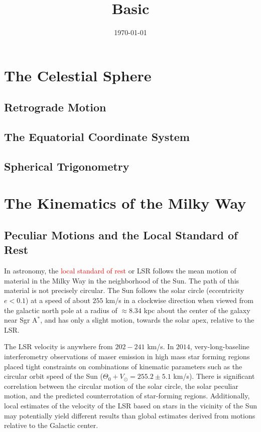 \documentclass[12pt,a4paper]{article}
\title{Basic}
\author{}
\date{\today}
\begin{document}
\maketitle

\section{The Celestial Sphere}

\subsection{Retrograde Motion}

\subsection{The Equatorial Coordinate System}

\subsection{Spherical Trigonometry}


\section{The Kinematics of the Milky Way}

\subsection{Peculiar Motions and the Local Standard of Rest}
\cite{Carroll2007}

In astronomy, the \textcolor{red}{local standard of rest} or LSR follows the mean motion of material in the Milky Way in the neighborhood of the Sun. The path of this material is not precisely circular. The Sun follows the solar circle (eccentricity $e < 0.1$) at a speed of about $255$ km/s in a clockwise direction when viewed from the galactic north pole at a radius of $\approx 8.34$ kpc about the center of the galaxy near Sgr A$^\ast$, and has only a slight motion, towards the solar apex, relative to the LSR.

The LSR velocity is anywhere from $202 - 241$ km/s. In $2014$, very-long-baseline interferometry observations of maser emission in high mass star forming regions placed tight constraints on combinations of kinematic parameters such as the circular orbit speed of the Sun ($\Theta_0 + V_\odot = 255.2 \pm 5.1$ km/s). There is significant correlation between the circular motion of the solar circle, the solar peculiar motion, and the predicted counterrotation of star-forming regions. Additionally, local estimates of the velocity of the LSR based on stars in the vicinity of the Sun may potentially yield different results than global estimates derived from motions relative to the Galactic center.
\end{document}
